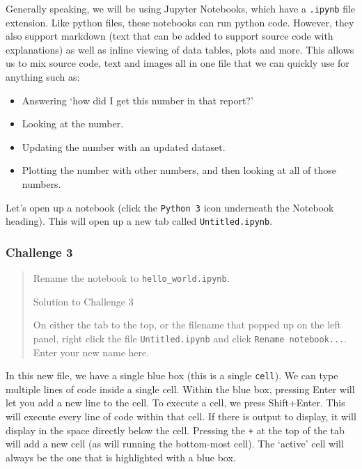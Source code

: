 \documentclass[
  letterpaper,
  DIV=11,
  numbers=noendperiod]{scrreprt}
\providecommand{\tightlist}{%
  \setlength{\itemsep}{0pt}\setlength{\parskip}{0pt}}\usepackage{longtable,booktabs,array}
\begin{document}
Generally speaking, we will be using Jupyter Notebooks, which have a
\texttt{.ipynb} file extension. Like python files, these notebooks can
run python code. However, they also support markdown (text that can be
added to support source code with explanations) as well as inline
viewing of data tables, plots and more. This allows us to mix source
code, text and images all in one file that we can quickly use for
anything such as:

\begin{itemize}
\tightlist
\item
  Answering `how did I get this number in that report?'
\item
  Looking at the number.
\item
  Updating the number with an updated dataset.
\item
  Plotting the number with other numbers, and then looking at all of
  those numbers.
\end{itemize}

Let's open up a notebook (click the \texttt{Python\ 3} icon underneath
the Notebook heading). This will open up a new tab called
\texttt{Untitled.ipynb}.

\hypertarget{challenge-3}{%
\subsubsection{Challenge 3}\label{challenge-3}}

\begin{quote}
Rename the notebook to \texttt{hello\_world.ipynb}.

Solution to Challenge 3

On either the tab to the top, or the filename that popped up on the left
panel, right click the file \texttt{Untitled.ipynb} and click
\texttt{Rename\ notebook...}. Enter your new name here.
\end{quote}

In this new file, we have a single blue box (this is a single
\texttt{cell}). We can type multiple lines of code inside a single cell.
Within the blue box, pressing Enter will let you add a new line to the
cell. To execute a cell, we press Shift+Enter. This will execute every
line of code within that cell. If there is output to display, it will
display in the space directly below the cell. Pressing the \texttt{+} at
the top of the tab will add a new cell (as will running the bottom-most
cell). The `active' cell will always be the one that is highlighted with
a blue box.
\end{document}
